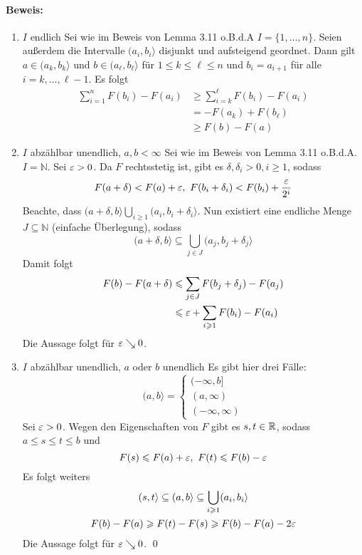 \paragraph{Beweis:}
\begin{enumerate}[label=\Roman*.]
    \item $I$ endlich\newline
    Sei wie im Beweis von Lemma 3.11 o.B.d.A $I=\{1,\hdots,n\}$. Seien au\ss{}erdem die Intervalle $(a_i,b_i\rangle$ disjunkt und aufsteigend geordnet. Dann gilt $a\in(a_k,b_k\rangle$ und $b\in(a_\ell,b_\ell\rangle$ f\"ur $1\leq k\leq\ell\leq n$ und $b_i=a_{i+1}$ f\"ur alle $i=k,\hdots,\ell-1$. Es folgt
    \begin{align*}
        \sum_{i=1}^nF(b_i)-F(a_i)&\geq\sum_{i=k}^\ell F(b_i)-F(a_i)\\
        &=-F(a_k)+F(b_\ell)\\&\geq F(b)-F(a)
    \end{align*}
    \item $I$ abz\"ahlbar unendlich, $a,b<\infty$\newline
    Sei wie im Beweis von Lemma 3.11 o.B.d.A. $I=\mathbb{N}$. Sei $\varepsilon>0$. Da $F$ rechtsstetig ist, gibt es $\delta,\delta_i>0,i\geq1$, sodass
    $$F(a+\delta)<F(a)+\eps,\ F(b_i+\delta_i)<F(b_i)+\frac{\eps}{2^i}$$
    Beachte, dass $(a+\delta,b\rangle\bigcup_{i\geq1}(a_i,b_i+\delta_i\rangle$. Nun existiert eine endliche Menge $J\subseteq\mathbb{N}$ (einfache \"Uberlegung), sodass
    $$(a+\delta,b\rangle\subseteq\bigcup_{j\in J}(a_j,b_j+\delta_j\rangle$$
    Damit folgt
    \begin{align*}
        F(b)-F(a+\delta)&\leqslant\sum_{j\in J}F(b_j+\delta_j)-F(a_j)\\
        &\leqslant\varepsilon+\sum_{i\geqslant1}F(b_i)-F(a_i)
    \end{align*}
    Die Aussage folgt f\"ur $\varepsilon\searrow0$.
    \item $I$ abz\"ahlbar unendlich, $a$ oder $b$ unendlich\newline
    Es gibt hier drei F\"alle:
    $$(a,b\rangle=
    \begin{cases}
        (-\infty,b] \\
        (a,\infty) \\
        (-\infty,\infty)
    \end{cases}$$
    Sei $\varepsilon>0$. Wegen den Eigenschaften von $F$ gibt es $s,t\in\mathbb{R}$, sodass $a\leq s\leq t\leq b$ und 
    $$F(s)\leqslant F(a)+\varepsilon,\ F(t)\leqslant F(b)-\varepsilon$$
    Es folgt weiters
    \begin{gather*}
        (s,t\rangle\subseteq(a,b\rangle\subseteq\bigcup_{i\geqslant1}(a_i,b_i\rangle\\
        F(b)-F(a)\geqslant F(t)-F(s)\geqslant F(b)-F(a)-2\varepsilon
    \end{gather*}
    Die Aussage folgt f\"ur $\varepsilon\searrow0$. \qed
\end{enumerate}

